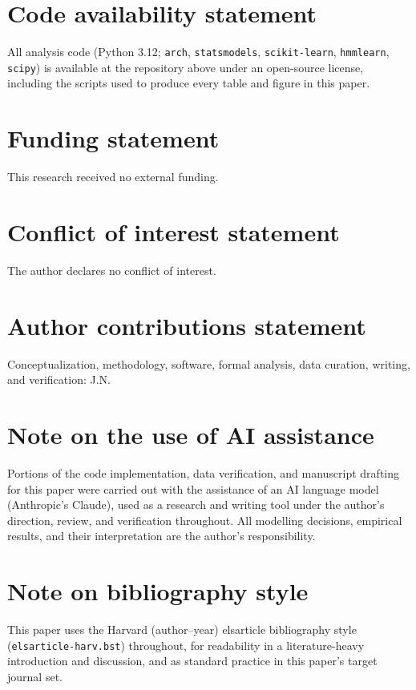 \documentclass[final,3p,times,authoryear]{elsarticle}
\begin{document}
\section*{Code availability statement}
All analysis code (Python 3.12; \texttt{arch}, \texttt{statsmodels},
\texttt{scikit-learn}, \texttt{hmmlearn}, \texttt{scipy}) is available at
the repository above under an open-source license, including the scripts
used to produce every table and figure in this paper.

\section*{Funding statement}
This research received no external funding.

\section*{Conflict of interest statement}
The author declares no conflict of interest.

\section*{Author contributions statement}
Conceptualization, methodology, software, formal analysis, data
curation, writing, and verification: J.N.

\section*{Note on the use of AI assistance}
Portions of the code implementation, data verification, and manuscript
drafting for this paper were carried out with the assistance of an AI
language model (Anthropic's Claude), used as a research and writing
tool under the author's direction, review, and verification throughout.
All modelling decisions, empirical results, and their interpretation
are the author's responsibility.

\section*{Note on bibliography style}
This paper uses the Harvard (author--year) elsarticle bibliography
style (\texttt{elsarticle-harv.bst}) throughout, for readability in a
literature-heavy introduction and discussion, and as standard practice
in this paper's target journal set.



\end{document}
